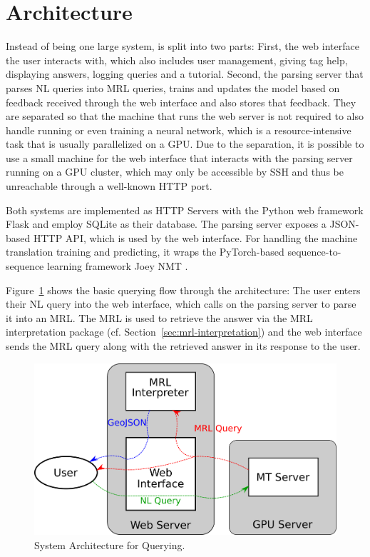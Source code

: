 \section{Architecture}

Instead of being one large system, \nlmapsweb{} is split into two parts: First,
the web interface the user interacts with, which also includes user management,
giving tag help, displaying answers, logging queries and a tutorial. Second, the
parsing server that parses NL queries into MRL queries, trains and updates the
model based on feedback received through the web interface and also stores that
feedback. They are separated so that the machine that runs the web server is not
required to also handle running or even training a neural network, which is a
resource-intensive task that is usually parallelized on a GPU. Due to the
separation, it is possible to use a small machine for the web interface that
interacts with the parsing server running on a GPU cluster, which may only be
accessible by SSH and thus be unreachable through a well-known HTTP port.

Both systems are implemented as HTTP Servers with the Python web framework
Flask and employ SQLite as their
database. The parsing server exposes a JSON-based HTTP API, which is used by the
web interface. For handling the machine translation training and predicting, it
wraps the PyTorch-based sequence-to-sequence learning
framework Joey NMT \parencite{kreutzer-2019}.

Figure~\ref{fig:querying-architecture} shows the basic querying flow through the
architecture: The user enters their NL query into the web interface, which calls
on the parsing server to parse it into an MRL. The MRL is used to retrieve the
answer via the MRL interpretation package (cf.
Section~\ref{sec:mrl-interpretation}) and the web interface sends the MRL query
along with the retrieved answer in its response to the user.

\begin{figure}[h]
  \centering
  \includegraphics[width=\textwidth]{fig/querying_architecture.png}
  \caption[Querying architecture]{System Architecture for Querying.}
  \label{fig:querying-architecture}
\end{figure}

